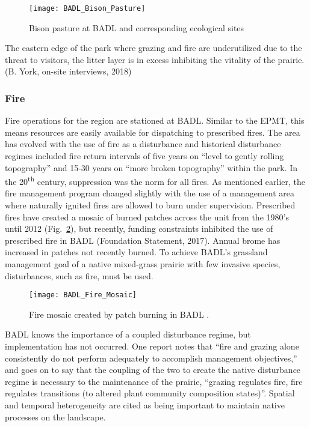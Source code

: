 \begin{figure}
	\centering
\texttt{[image: BADL\_Bison\_Pasture]}
\caption{Bison pasture at BADL and corresponding ecological sites \citep{ashton2016}} 
\label{fig:BADLbison}
\end{figure}

The eastern edge of the park where grazing and fire are underutilized due to the threat to visitors, the litter layer is in excess inhibiting the vitality of the prairie. (B. York, on-site interviews, 2018)

\subsubsection{Fire }

Fire operations for the region are stationed at BADL.
Similar to the EPMT, this means resources are easily available for dispatching to prescribed fires. 
The area has evolved with the use of fire as a disturbance and historical disturbance regimes included fire return
intervals of five years on ``level to gently rolling topography'' and 15-30 years on ``more broken topography'' within the park. 
In the 20\textsuperscript{th} century, suppression was the norm for all fires.
As mentioned earlier, the fire management program changed slightly with the use of a management area where naturally ignited fires are allowed to burn under supervision.
Prescribed fires have created a mosaic of burned patches across the unit from the 1980's until 2012 (Fig.~\ref{fig:BADLfire}), but recently, funding constraints inhibited the use of prescribed fire in BADL (Foundation Statement, 2017). 
Annual brome has increased in patches not recently burned. 
To achieve BADL's grassland management goal of a native mixed-grass prairie with few invasive species, disturbances, such as fire, must be used.

\begin{figure} 
\centering
\texttt{[image: BADL\_Fire\_Mosaic]}
\caption{Fire mosaic created by patch burning in BADL \citep{ashton2016}.}
\label{fig:BADLfire}
\end{figure}

BADL knows the importance of a coupled disturbance regime, but implementation has not occurred. 
One report notes that ``fire and grazing alone consistently do not perform adequately to accomplish management objectives,'' and goes on to say that the coupling of the two to create the native disturbance regime is necessary to the maintenance of the prairie, ``grazing regulates fire, fire regulates transitions (to altered plant community composition states)''. 
Spatial and temporal heterogeneity are cited as being important to maintain native processes on the landscape.

